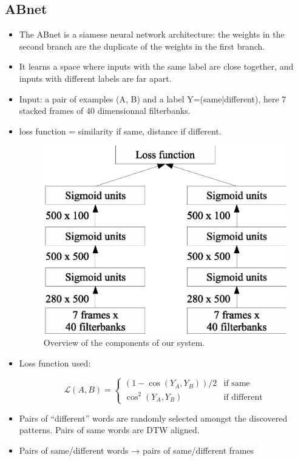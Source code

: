 \documentclass[final]{beamer}
\newcommand{\abnet}{{\sc ABnet}}
\newcommand{\norm}[1]{\lVert#1\rVert}
\newcommand{\tup}[1]{\langle#1\rangle}
\begin{document}
\begin{frame}[t]
\begin{multicols}{2}
\subsection{ABnet}

\begin{itemize}
\item The \abnet{} is a siamese neural network architecture: the weights in the second branch are the duplicate of the weights in the first branch.
\item It learns a space where inputs with the same label are close together, and inputs with different labels are far apart. 
\item Input: a pair of examples (A, B) and a label Y=(same|different), here 7 stacked frames of 40 dimensionnal filterbanks.
\item loss function = similarity if same, distance if different.

\columnbreak
\vspace{1cm}
\begin{figure}[ht!]
  \begin{center}
    \includegraphics[width=0.65\columnwidth]{abnet}
    \caption{\label{fig:system}Overview of the components of our system.}
  \end{center}
\end{figure}

\item Loss function used:
\begin{small}
\[
\mathcal{L}(A, B) =
\begin{cases}
(1-\cos(Y_A, Y_B)) / 2 & \text{if same} \\
\cos^2(Y_A, Y_B)       & \text{if different}
\end{cases}
\]
\end{small}
\item Pairs of ``different'' words are randomly selected amongst the discovered patterns. Pairs of same words are DTW aligned.
\item Pairs of same/different words → pairs of same/different frames


\end{itemize}
\end{multicols}
\end{frame}
\end{document}
